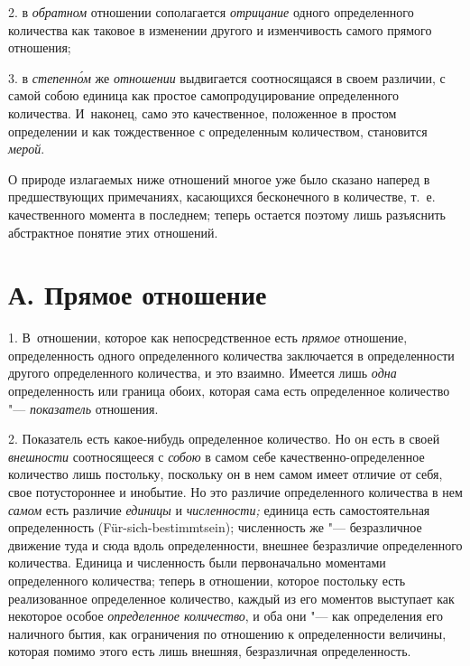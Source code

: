 2. в {\em обратном} отношении сополагается
{\em отрицание} одного определенного количества как
таковое в изменении другого и изменчивость самого прямого отношения;

3. в {\em степенн\'{о}м} же
{\em отношении} выдвигается соотносящаяся в своем
различии, с самой собою единица как простое самопродуцирование
определенного количества. И~наконец, само это качественное, положенное в
простом определении и как тождественное с определенным количеством,
становится {\em мерой}.

О природе излагаемых ниже отношений многое уже было сказано наперед в
предшествующих примечаниях, касающихся бесконечного в количестве, т.~е.
качественного момента в последнем; теперь остается поэтому лишь разъяснить
абстрактное понятие этих отношений.

\section[А. Прямое отношение]{А. Прямое отношение}
1. В~отношении, которое как непосредственное есть
{\em прямое} отношение, определенность одного
определенного количества заключается в определенности другого определенного
количества, и это взаимно. Имеется лишь {\em одна}
определенность или граница обоих, которая сама есть определенное количество
"--- {\em показатель} отношения.

2. Показатель есть какое-нибудь определенное количество. Но он есть в своей
{\em внешности} соотносящееся с
{\em собою} в самом себе качественно-определенное
количество лишь постольку, поскольку он в нем самом имеет отличие от себя,
свое потустороннее и инобытие. Но это различие определенного количества в
нем {\em самом} есть различие {\em единицы} и {\em численности;}
единица есть самостоятельная определенность (Für-sich-bestimmtsein);
численность же "--- безразличное движение туда и сюда вдоль определенности,
внешнее безразличие определенного количества. Единица и численность были
первоначально моментами определенного количества; теперь в отношении,
которое постольку есть реализованное определенное количество, каждый из его
моментов выступает как некоторое особое
{\em определенное количество}, и оба они "--- как
определения его наличного бытия, как ограничения по отношению к
определенности величины, которая помимо этого есть лишь внешняя,
безразличная определенность.

